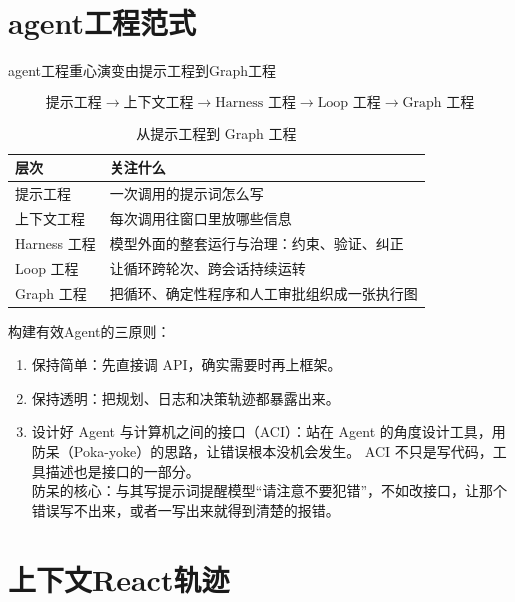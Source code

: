 \section{agent工程范式}
agent工程重心演变由提示工程到Graph工程

\begin{tcolorbox}[enhanced, sharp corners, boxrule=0pt, frame hidden,
                  borderline west={3pt}{0pt}{structurecolor},
                  colback=structurecolor!5]
\[
  \text{提示工程} \rightarrow \text{上下文工程} \rightarrow \text{Harness 工程}
  \rightarrow \text{Loop 工程} \rightarrow \text{Graph 工程}
\]
\end{tcolorbox}

\begin{table}[htbp]
\centering
\caption{从提示工程到 Graph 工程}
\label{tab:engineering-layers}
\begin{tabular}{p{3cm} p{10cm}}
  \toprule
  层次 & 关注什么 \\
  \midrule
  提示工程     & 一次调用的提示词怎么写 \\
  上下文工程   & 每次调用往窗口里放哪些信息 \\
  Harness 工程 & 模型外面的整套运行与治理：约束、验证、纠正 \\
  Loop 工程    & 让循环跨轮次、跨会话持续运转 \\
  Graph 工程   & 把循环、确定性程序和人工审批组织成一张执行图 \\
  \bottomrule
\end{tabular}
\end{table}

构建有效Agent的三原则：
\begin{enumerate}
  \item 保持简单：先直接调 API，确实需要时再上框架。

  \item 保持透明：把规划、日志和决策轨迹都暴露出来。

  \item 设计好 Agent 与计算机之间的接口（ACI）：站在 Agent 的角度设计工具，用防呆（Poka-yoke）的思路，让错误根本没机会发生。
ACI 不只是写代码，工具描述也是接口的一部分。\\
防呆的核心：与其写提示词提醒模型“请注意不要犯错”，不如改接口，让那个错误写不出来，或者一写出来就得到清楚的报错。
\end{enumerate}

\section{上下文React轨迹}

